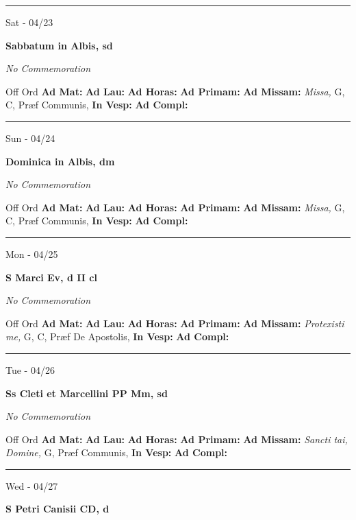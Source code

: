 \documentclass[letterpaper, 10pt]{article}
\begin{document}
\hrule
\begin{center}
Sat - 04/23
\end{center}\textbf{ \large Sabbatum in Albis, \textnormal{\normalsize sd}}

\textit{No Commemoration}\begin{justify}
Off Ord
\textbf{Ad Mat: }
\textbf{Ad Lau: }
\textbf{Ad Horas: }
\textbf{Ad Primam: }
\textbf{Ad Missam:} \textit{Missa, } G, C, Præf Communis, 
\textbf{In Vesp: }
\textbf{Ad Compl: }\end{justify}



\hrule
\begin{center}
Sun - 04/24
\end{center}\textbf{ \large Dominica in Albis, \textnormal{\normalsize dm}}

\textit{No Commemoration}\begin{justify}
Off Ord
\textbf{Ad Mat: }
\textbf{Ad Lau: }
\textbf{Ad Horas: }
\textbf{Ad Primam: }
\textbf{Ad Missam:} \textit{Missa, } G, C, Præf Communis, 
\textbf{In Vesp: }
\textbf{Ad Compl: }\end{justify}



\hrule
\begin{center}
Mon - 04/25
\end{center}\textbf{ \large S Marci Ev, \textnormal{\normalsize d II cl}}

\textit{No Commemoration}\begin{justify}
Off Ord
\textbf{Ad Mat: }
\textbf{Ad Lau: }
\textbf{Ad Horas: }
\textbf{Ad Primam: }
\textbf{Ad Missam:} \textit{Protexisti me, } G, C, Præf De Apostolis, 
\textbf{In Vesp: }
\textbf{Ad Compl: }\end{justify}



\hrule
\begin{center}
Tue - 04/26
\end{center}\textbf{ \large Ss Cleti et Marcellini PP Mm, \textnormal{\normalsize sd}}

\textit{No Commemoration}\begin{justify}
Off Ord
\textbf{Ad Mat: }
\textbf{Ad Lau: }
\textbf{Ad Horas: }
\textbf{Ad Primam: }
\textbf{Ad Missam:} \textit{Sancti tai, Domine, } G, Præf Communis, 
\textbf{In Vesp: }
\textbf{Ad Compl: }\end{justify}



\hrule
\begin{center}
Wed - 04/27
\end{center}\textbf{ \large S Petri Canisii CD, \textnormal{\normalsize d}}
\end{document}
